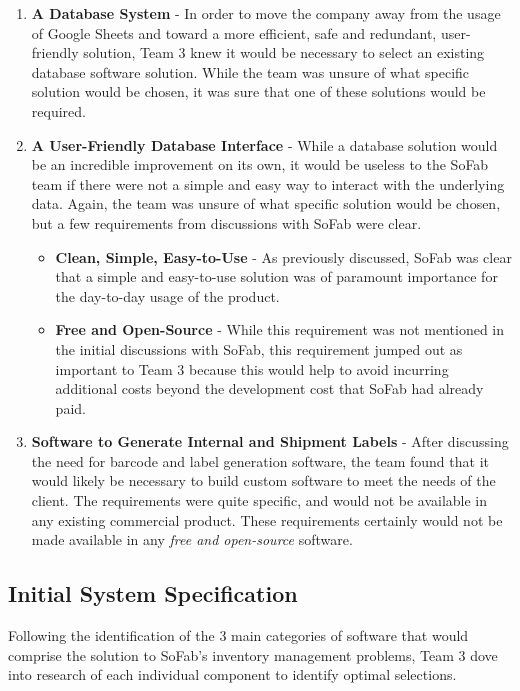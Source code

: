\documentclass{article}
\begin{document}
\begin{enumerate}
    \item \textbf{A Database System} - In order to move the company away from the usage of Google Sheets and toward a more efficient, 
        safe and redundant, user-friendly solution, Team 3 knew it would be necessary to select an existing database software solution.
        While the team was unsure of what specific solution would be chosen, it was sure that one of these solutions would be required.
    \item \textbf{A User-Friendly Database Interface} - While a database solution would be an incredible improvement on its own, it 
        would be useless to the SoFab team if there were not a simple and easy way to interact with the underlying data. Again, the team
        was unsure of what specific solution would be chosen, but a few requirements from discussions with SoFab were clear. 
        \begin{itemize}
            \item \textbf{Clean, Simple, Easy-to-Use} - As previously discussed, SoFab was clear that a simple and easy-to-use solution
                was of paramount importance for the day-to-day usage of the product. 
            \item \textbf{Free and Open-Source} - While this requirement was not mentioned in the initial discussions with SoFab, this 
                requirement jumped out as important to Team 3 because this would help to avoid incurring additional costs beyond the 
                development cost that SoFab had already paid. 
        \end{itemize}
    \item \textbf{Software to Generate Internal and Shipment Labels} - After discussing the need for barcode and label generation software,
        the team found that it would likely be necessary to build custom software to meet the needs of the client. The requirements were 
        quite specific, and would not be available in any existing commercial product. These requirements certainly would not be made 
        available in any \textit{free and open-source} software.
\end{enumerate}
\subsection{Initial System Specification}
Following the identification of the 3 main categories of software that would comprise the solution to SoFab's inventory management 
problems, Team 3 dove into research of each individual component to identify optimal selections. 
\end{document}
